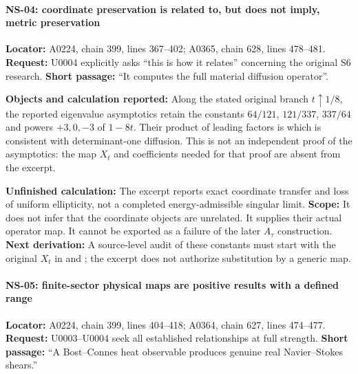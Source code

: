 \paragraph{NS-04: coordinate preservation is related to, but does not
imply, metric
preservation}\label{TranscriptLedgerStage:ns-04-coordinate-preservation-is-related-to-but-does-not-imply-metric-preservation}

\textbf{Locator:} A0224, chain 399, lines 367--402; A0365, chain 628,
lines 478--481. \textbf{Request:} U0004 explicitly asks ``this is how it
relates'' concerning the original S6 research. \textbf{Short passage:}
``It computes the full material diffusion operator''.

\textbf{Objects and calculation reported:}  Along the stated original branch \(t\uparrow1/8\), the reported
eigenvalue asymptotics retain the constants \(64/121\), \(121/337\),
\(337/64\) and powers \(+3,0,-3\) of \(1-8t\). Their product of leading
factors is  which is consistent with determinant-one diffusion. This is not an
independent proof of the asymptotics: the map \(X_t\) and coefficients
needed for that proof are absent from the excerpt.

\textbf{Unfinished calculation:} The excerpt reports exact coordinate
transfer and loss of uniform ellipticity, not a completed
energy-admissible singular limit. \textbf{Scope:} It does not infer that
the coordinate objects are unrelated. It supplies their actual operator
map. It cannot be exported as a failure of the later \(A_\tau\)
construction. \textbf{Next derivation:} A source-level audit of these
constants must start with the original \(X_t\) in
\protect{} and
\protect{}; the excerpt does not authorize
substitution by a generic map.

\paragraph{NS-05: finite-sector physical maps are positive results with
a defined
range}\label{TranscriptLedgerStage:ns-05-finite-sector-physical-maps-are-positive-results-with-a-defined-range}

\textbf{Locator:} A0224, chain 399, lines 404--418; A0364, chain 627,
lines 474--477. \textbf{Request:} U0003--U0004 seek all established
relationships at full strength. \textbf{Short passage:} ``A Bost--Connes
heat observable produces genuine real Navier--Stokes shears.''

